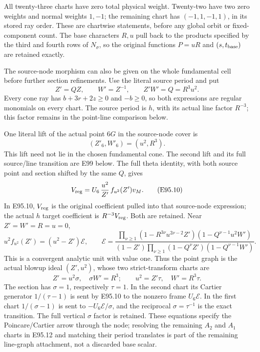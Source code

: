 All twenty-three charts have zero total physical
weight. Twenty-two have two zero weights and normal
weights \(1,-1\); the remaining chart has
\((-1,1,-1,1)\), in its stored ray order. These
are chartwise statements, before any global orbit
or fixed-component count. The base characters
\(R,u\) pull back to the products specified by the
third and fourth rows of \(N_\sigma\), so the
original functions \(P=uR\) and
\((s,t_{\rm base})\) are retained exactly.

The source-node morphism can also be given on the
whole fundamental cell before further section
refinements. Use the literal source period and put
\[
 Z'=QZ,\qquad W'=Z^{-1},\qquad Z'W'=Q=R^3u^2.
 \tag{E95.8}
\]
Every cone ray has \(b+3r+2z\ge0\) and \(-b\ge0\),
so both expressions are regular monomials on every
chart. The source period is \(h\), with its actual
line factor \(R^{-3}\); this factor remains in
the point-line comparison below.

One literal lift of the actual point \(6G\) in the source-node cover is
\[
 (Z'_6,W'_6)=(u^2,R^3).                         \tag{E95.9}
\]
This lift need not lie in the chosen fundamental cone. The
second lift and its full source/line transition are E99 below.
The full theta identity, with both source point and
section shifted by the same \(Q\), gives
\[
 V_{\rm reg}
   =U_6\,\frac{u^2}{Z'}\,f_{u^2}(Z')v_M.         \tag{E95.10}
\]
In E95.10, \(V_{\rm reg}\) is the original coefficient
pulled into that source-node expression; the actual \(h\)
target coefficient is \(R^{-3}V_{\rm reg}\). Both are
retained. Near \(Z'=W'=R=u=0\),
\[
 u^2 f_{u^2}(Z')=(u^2-Z')\mathcal E,\qquad
 \mathcal E=
 \frac{\prod_{\nu\ge1}
 (1-R^{3\nu}u^{2\nu-2}Z')
 (1-Q^{\nu-1}u^2W')}
 {(1-Z')\prod_{\nu\ge1}
 (1-Q^\nu Z')(1-Q^{\nu-1}W')}.                  \tag{E95.11}
\]
This is a convergent analytic unit with value one.
Thus the point graph is the actual blowup ideal
\((Z',u^2)\), whose two strict-transform charts
are
\[
 Z'=u^2\sigma,\quad \sigma W'=R^3;\qquad
 u^2=Z'\tau,\quad W'=R^3\tau.                   \tag{E95.12}
\]
The section has \(\sigma=1\), respectively
\(\tau=1\). In the second chart its Cartier
generator \(1/(\tau-1)\) is sent by E95.10
to the nonzero frame \(U_6\mathcal E\).
In the first chart \(1/(\sigma-1)\) is sent
to \(-U_6\mathcal E/\sigma\), and the reciprocal
\(\sigma=\tau^{-1}\) is the exact transition.
The full vertical \(\sigma\) factor is retained.
These equations specify the Poincare/Cartier arrow
through the node; resolving the remaining \(A_2\)
and \(A_1\) charts in E95.12 and matching their
period translates is part of the remaining line-graph
attachment, not a discarded base scalar.

